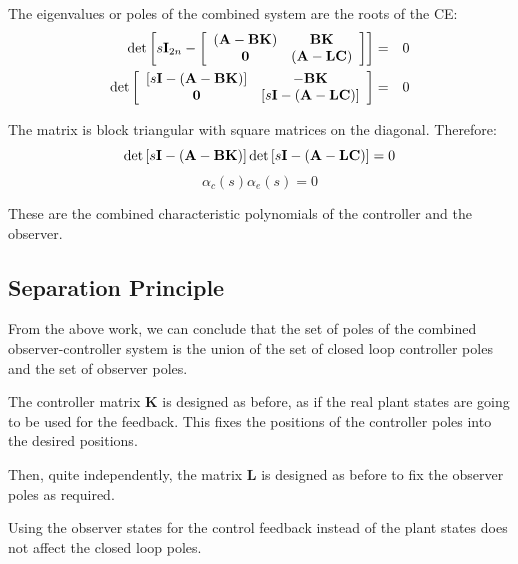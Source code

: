 The eigenvalues or poles of the combined system are the roots of the CE:
\begin{eqnarray*}
	\det \left[ {s{\bf{I}}_{2n}  - \left[ {\begin{array}{*{20}c}
	   {\left( {{\bf{A}} - {\bf{BK}}} \right)} & {{\bf{BK}}}  \\
	   {\bf{0}} & {\left( {{\bf{A}} - {\bf{LC}}} \right)}  \\
	\end{array}} \right]} \right] & = &  0 \\
	\det \left[ {\begin{array}{*{20}c}
	   {\left[ {s{\bf{I}} - \left( {{\bf{A}} - {\bf{BK}}} \right)} \right]} & { - {\bf{BK}}}  \\
	   {\bf{0}} & {\left[ {s{\bf{I}} - \left( {{\bf{A}} - {\bf{LC}}} \right)} \right]}  \\
	\end{array}} \right] & = & 0
\end{eqnarray*}
 
The matrix is block triangular with square matrices on the diagonal. Therefore:
\[
	\det \left[ {s{\bf{I}} - \left( {{\bf{A}} - {\bf{BK}}} \right)} \right]\det\left[ {s{\bf{I}} - \left( {{\bf{A}} - {\bf{LC}}} \right)} \right] = 0 
\]
\[
	\alpha_c(s)\alpha_e(s) = 0 
\]
 

These are the combined characteristic polynomials of the controller and the observer.





\subsection*{Separation Principle} %
\label{sub:separation_principle}

From the above work, we can conclude that the set of poles of the combined observer-controller system is the union of the set of closed loop controller poles and the set of observer poles.

The controller matrix  $\mathbf{K}$  is designed as before, as if the real plant states are going to be used for the feedback. This fixes the positions of the controller poles into the desired positions.

Then, quite independently, the matrix $\mathbf{L}$ is designed as before to fix the observer poles as required.

Using the observer states for the control feedback instead of the plant states does not affect the closed loop poles.

